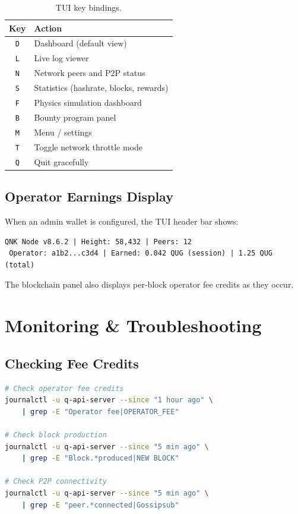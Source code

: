 \documentclass[11pt,a4paper]{article}
\begin{document}
\begin{table}[H]
\centering
\begin{tabular}{@{}cl@{}}
\toprule
\textbf{Key} & \textbf{Action} \\
\midrule
\texttt{D} & Dashboard (default view) \\
\texttt{L} & Live log viewer \\
\texttt{N} & Network peers and P2P status \\
\texttt{S} & Statistics (hashrate, blocks, rewards) \\
\texttt{F} & Physics simulation dashboard \\
\texttt{B} & Bounty program panel \\
\texttt{M} & Menu / settings \\
\texttt{T} & Toggle network throttle mode \\
\texttt{Q} & Quit gracefully \\
\bottomrule
\end{tabular}
\caption{TUI key bindings.}
\end{table}

\subsection{Operator Earnings Display}

When an admin wallet is configured, the TUI header bar shows:

\begin{lstlisting}[title={TUI header example}]
 QNK Node v8.6.2 | Height: 58,432 | Peers: 12
 Operator: a1b2...c3d4 | Earned: 0.042 QUG (session) | 1.25 QUG (total)
\end{lstlisting}

The blockchain panel also displays per-block operator fee credits as they occur.

\section{Monitoring \& Troubleshooting}

\subsection{Checking Fee Credits}

\begin{lstlisting}[language=bash,title={journalctl commands}]
# Check operator fee credits
journalctl -u q-api-server --since "1 hour ago" \
    | grep -E "Operator fee|OPERATOR_FEE"

# Check block production
journalctl -u q-api-server --since "5 min ago" \
    | grep -E "Block.*produced|NEW BLOCK"

# Check P2P connectivity
journalctl -u q-api-server --since "5 min ago" \
    | grep -E "peer.*connected|Gossipsub"
\end{lstlisting}
\end{document}
